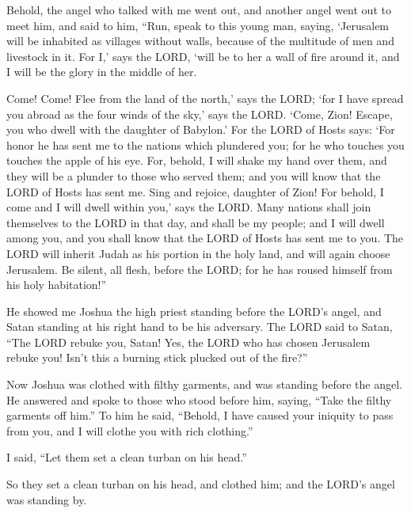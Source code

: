 \myverse{}Behold, the angel who talked with me went out, and another angel
went out to meet him,
\myverse{}and said to him, “Run, speak to this young man, saying, ‘Jerusalem will be inhabited
as villages without walls, because of the multitude of men and livestock in it.
\myverse{}For I,’ says the LORD, ‘will be to her a wall of fire around it, and I will
be the glory in the middle of her.

\myverse{}Come! Come! Flee from the land of the north,’ says the LORD; ‘for
I have spread you abroad as the four winds of the sky,’ says the LORD.
\myverse{}‘Come, Zion! Escape, you who dwell with the daughter of Babylon.’
\myverse{}For the LORD of Hosts says: ‘For honor he has sent me to the nations which plundered
you; for he who touches you touches the apple of his eye.
\myverse{}For, behold, I will shake my hand over them, and they will be a plunder to those
who served them; and you will know that the LORD of Hosts has sent me.
\myverse{}Sing and rejoice, daughter of Zion! For behold, I come and I will dwell within
you,’ says the LORD.
\myverse{}Many nations shall join themselves to the LORD in that day, and shall be my
people; and I will dwell among you, and you shall know that the LORD of Hosts has sent me to you.
\myverse{}The LORD will inherit Judah as his portion in the holy land, and will again
choose Jerusalem.
\myverse{}Be silent, all flesh, before the LORD; for he has roused himself from his
holy habitation!”



\mychapter{} \myverse*{}He showed me Joshua the high priest standing before the LORD’s
angel, and Satan standing at his right hand to be his adversary.
\myverse{}The LORD said to Satan, “The LORD rebuke you, Satan! Yes, the LORD who has chosen
Jerusalem rebuke you! Isn’t this a burning stick plucked out of the fire?”

\myverse{}Now Joshua was clothed with filthy garments, and was standing before
the angel.
\myverse{}He answered and spoke to those who stood before him, saying, “Take the filthy
garments off him.” To him he said, “Behold, I have caused your iniquity to pass from you, and I will clothe
you with rich clothing.”

\myverse{}I said, “Let them set a clean turban on his head.”

So they set a clean turban on his head, and clothed him; and the LORD’s angel was standing
by.

